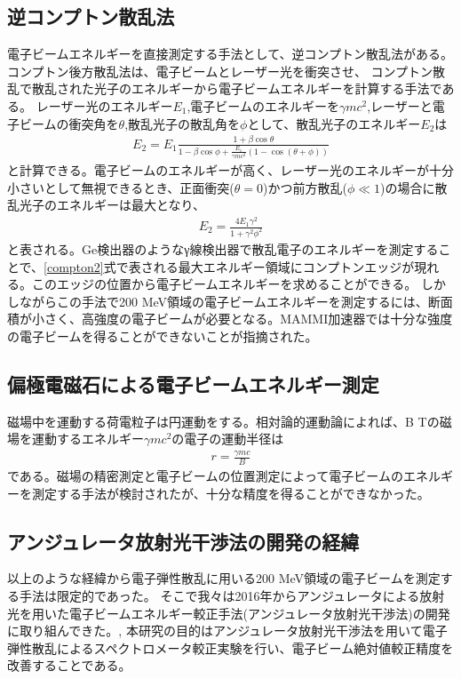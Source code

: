 \documentclass[a4paper,11pt,uplatex]{jsbook}
\begin{document}
\subsection{逆コンプトン散乱法}
電子ビームエネルギーを直接測定する手法として、逆コンプトン散乱法がある。コンプトン後方散乱法は、電子ビームとレーザー光を衝突させ、
コンプトン散乱で散乱された光子のエネルギーから電子ビームエネルギーを計算する手法である。
レーザー光のエネルギー$E_1$,電子ビームのエネルギーを$\gamma mc^2$,レーザーと電子ビームの衝突角を$\theta$,散乱光子の散乱角を$\phi$として、散乱光子のエネルギー$E_2$は
\begin{eqnarray}
  E_2 = E_1\frac{1+\beta\cos{\theta}}{1-\beta\cos{\phi} + \frac{E_1}{\gamma mc^2} (1-\cos{(\theta +\phi)})} \label{compton}
\end{eqnarray}
と計算できる。電子ビームのエネルギーが高く、レーザー光のエネルギーが十分小さいとして無視できるとき、正面衝突($\theta = 0$)かつ前方散乱($\phi \ll 1$)の場合に散乱光子のエネルギーは最大となり、
\begin{eqnarray}
  E_2 = \frac{4E_1\gamma^2}{1 + \gamma^2\phi^2} \label{compton2}
\end{eqnarray}
と表される。Ge検出器のようなγ線検出器で散乱電子のエネルギーを測定することで、\ref{compton2}式で表される最大エネルギー領域にコンプトンエッジが現れる。このエッジの位置から電子ビームエネルギーを求めることができる。
しかしながらこの手法で200 MeV領域の電子ビームエネルギーを測定するには、断面積が小さく、高強度の電子ビームが必要となる。MAMMI加速器では十分な強度の電子ビームを得ることができないことが指摘された。
\subsection{偏極電磁石による電子ビームエネルギー測定}
磁場中を運動する荷電粒子は円運動をする。相対論的運動論によれば、B Tの磁場を運動するエネルギー$\gamma mc^2$の電子の運動半径は
\begin{eqnarray}
  r = \frac{\gamma mc}{B}
\end{eqnarray}
である。磁場の精密測定と電子ビームの位置測定によって電子ビームのエネルギーを測定する手法が検討されたが、十分な精度を得ることができなかった。
\subsection{アンジュレータ放射光干渉法の開発の経緯}
以上のような経緯から電子弾性散乱に用いる200 MeV領域の電子ビームを測定する手法は限定的であった。
そこで我々は2016年からアンジュレータによる放射光を用いた電子ビームエネルギー較正手法(アンジュレータ放射光干渉法)の開発に取り組んできた。\cite{klag2018},\cite{klag2023}
本研究の目的はアンジュレータ放射光干渉法を用いて電子弾性散乱によるスペクトロメータ較正実験を行い、電子ビーム絶対値較正精度を改善することである。
\end{document}
